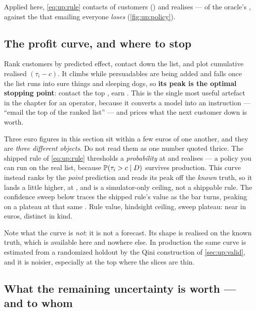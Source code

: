 Applied here, \cref{eq:up:rule} contacts \nbOneNTargeted{} of \nbOneNCustomers{} customers
(\pc{\nbOneTargetShare}) and realises \eur{\nbOneModelProfit} --- \pc{\nbOneCapture} of the
oracle's \eur{\nbOneOracleProfit}, against the \eur{\nbOneTreatAllLoss} that emailing everyone
\emph{loses} (\cref{fig:up:policy}).



\subsection*{The profit curve, and where to stop}

Rank customers by predicted effect, contact down the list, and plot cumulative realised
$(\tau_i - c)$. It climbs while persuadables are being added and falls once the list runs into
sure things and sleeping dogs, so \textbf{its peak is the optimal stopping point}: contact the top
\pc{\nbOneStopFrac}, earn \eur{\nbOneStopProfit}. This is the single most useful artefact in the
chapter for an operator, because it converts a model into an instruction --- ``email the top
\pc{\nbOneStopFrac} of the ranked list'' --- and prices what the next customer down is worth.

Three euro figures in this section sit within a few euros of one another, and they are \emph{three
different objects}. Do not read them as one number quoted thrice. The shipped rule of \cref{eq:up:rule}
thresholds a \emph{probability} at \nbOneConfBar{} and realises \eur{\nbOneModelProfit} --- a policy
you can run on the real list, because $\operatorname{\mathbb{P}}(\tau_i > c \mid D)$ survives production. This curve instead
ranks by the \emph{point} prediction and reads its peak off the \emph{known} truth, so it lands a
little higher, at \eur{\nbOneStopProfit}, and is a simulator-only ceiling, not a shippable rule. The
confidence sweep below traces the shipped rule's value as the bar turns, peaking on a plateau at that
same \eur{\nbOneModelProfit}. Rule value, hindsight ceiling, sweep plateau: near in euros, distinct in
kind.

Note what the curve is \emph{not}: it is not a forecast. Its shape is realised on the known truth,
which is available here and nowhere else. In production the same curve is estimated from a
randomized holdout by the Qini construction of \cref{sec:up:valid}, and it is noisier, especially
at the top where the slices are thin.

\subsection*{What the remaining uncertainty is worth --- and to whom}

